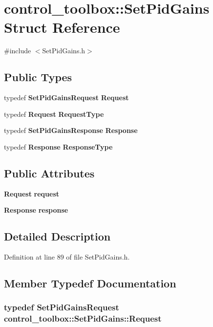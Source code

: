 \section{control\-\_\-toolbox\-:\-:\-Set\-Pid\-Gains \-Struct \-Reference}
\label{structcontrol__toolbox_1_1SetPidGains}


{\ttfamily \#include $<$\-Set\-Pid\-Gains.\-h$>$}

\subsection*{\-Public \-Types}
\begin{DoxyCompactItemize}
\item 
typedef {\bf \-Set\-Pid\-Gains\-Request} {\bf \-Request}
\item 
typedef {\bf \-Request} {\bf \-Request\-Type}
\item 
typedef {\bf \-Set\-Pid\-Gains\-Response} {\bf \-Response}
\item 
typedef {\bf \-Response} {\bf \-Response\-Type}
\end{DoxyCompactItemize}
\subsection*{\-Public \-Attributes}
\begin{DoxyCompactItemize}
\item 
{\bf \-Request} {\bf request}
\item 
{\bf \-Response} {\bf response}
\end{DoxyCompactItemize}


\subsection{\-Detailed \-Description}


\-Definition at line 89 of file \-Set\-Pid\-Gains.\-h.



\subsection{\-Member \-Typedef \-Documentation}
\subsubsection[{\-Request}]{\setlength{\rightskip}{0pt plus 5cm}typedef {\bf \-Set\-Pid\-Gains\-Request} {\bf control\-\_\-toolbox\-::\-Set\-Pid\-Gains\-::\-Request}}\label{structcontrol__toolbox_1_1SetPidGains_acd47f6e99fcce68721494d590b7e96bd}


